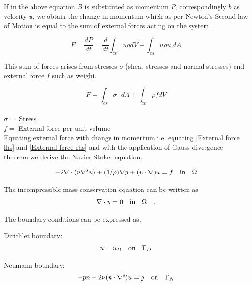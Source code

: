 \documentclass[a4paper,12pt]{book}
\begin{document}
If in the above equation $B$ is substituted as momentum $P$, correspondingly $b$ as velocity $u$, we obtain the change in momentum which as per Newton's Second law of Motion is equal to the sum of external forces acting on the system. 

\begin{equation}\label{External force lhs}
F = \frac{dP}{dt} = \frac{d}{dt} \int_{cv} u \rho dV + \int_{cs} u \rho u.dA 
\end{equation}

This sum of forces arises from stresses $\sigma$ (shear stresses and normal stresses) and external force $f$ such as weight. 

\begin{equation}\label{External force rhs}
F = \int_{cs} \sigma \cdot dA + \int_{cv} \rho f dV
\end{equation}
\\
$\sigma =$ Stress\\
$f =$ External force per unit volume\\

Equating external force with change in momentum i.e. equating \eqref{External force lhs} and \eqref{External force rhs} and with the application of Gauss divergence theorem we derive the Navier Stokes equation.

\begin{equation} \label{navier_stokes}
-2\nabla \cdot (\nu \nabla^s u) + (1/\rho) \nabla p + (u \cdot \nabla)u = f \quad   \textnormal{in}  \quad \Omega
\end{equation} 

The incompressible mass conservation equation can be written as
\begin{equation}\label{mass_conservation}
\nabla \cdot u=0 \quad   \textnormal{in}  \quad \Omega \quad \textrm{.}
\end{equation}

The boundary conditions can be expressed as,

Dirichlet boundary:
\begin{equation}\label{dirichlet_ns}
u=u_D \quad \textnormal{on} \quad \Gamma_D
\end{equation}

Neumann boundary:
\begin{equation} \label{neumann_ns}
-pn + 2\nu(n \cdot \nabla^s)u = g \quad   \textnormal{on}  \quad \Gamma_N
\end{equation}
\end{document}
